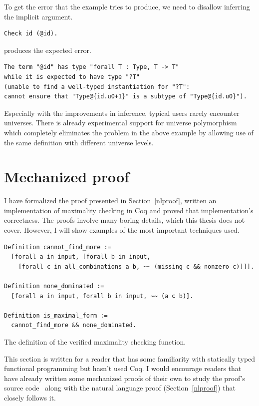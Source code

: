 \documentclass[english, 12pt, a4paper, sci, a-1b, online]{aaltothesis}
\begin{document}
To get the error that the example tries to produce, we need to disallow inferring the implicit argument.
\begin{verbatim}
Check id (@id).
\end{verbatim}
produces the expected error.
\begin{verbatim}
The term "@id" has type "forall T : Type, T -> T"
while it is expected to have type "?T"
(unable to find a well-typed instantiation for "?T":
cannot ensure that "Type@{id.u0+1}" is a subtype of "Type@{id.u0}").
\end{verbatim}

Especially with the improvements in inference, typical users rarely encounter universes. There is already experimental support for universe polymorphism~\cite{coqRefman} which completely eliminates the problem in the above example by allowing use of the same definition with different universe levels.

\section{Mechanized proof}\label{mechproof}

I have formalized the proof presented in Section~\ref{nlproof}, written an implementation of maximality checking in Coq and proved that implementation's correctness. The proofs involve many boring details, which this thesis does not cover. However, I will show examples of the most important techniques used.

\begin{listing}[h]
\begin{verbatim}
Definition cannot_find_more :=
  [forall a in input, [forall b in input,
    [forall c in all_combinations a b, ~~ (missing c && nonzero c)]]].

Definition none_dominated :=
  [forall a in input, forall b in input, ~~ (a ⊂ b)].

Definition is_maximal_form :=
  cannot_find_more && none_dominated.
\end{verbatim}
\caption{The definition of the verified maximality checking function.}
\label{is_maximal_form}
\end{listing}

This section is written for a reader that has some familiarity with statically typed functional programming but hasn't used Coq. I would encourage readers that have already written some mechanized proofs of their own to study the proof's source code~\cite{source_code} along with the natural language proof (Section~\ref{nlproof}) that closely follows it.
\end{document}
